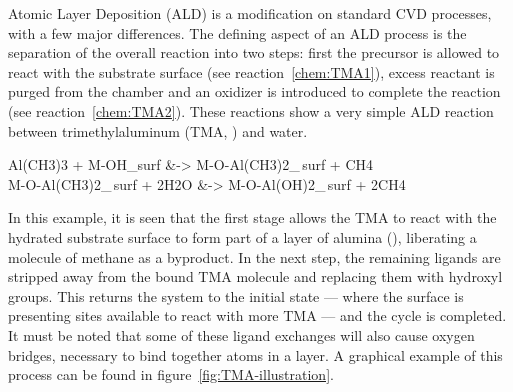 Atomic Layer Deposition (ALD) is a modification on standard CVD processes, with a few major differences. The defining aspect of an ALD process is the separation of the overall reaction into two steps: first the precursor is allowed to react with the substrate surface (see reaction~\ref{chem:TMA1}), excess reactant is purged from the chamber and an oxidizer is introduced to complete the reaction (see reaction~\ref{chem:TMA2}). These reactions show a very simple ALD reaction between trimethylaluminum (TMA, ) and water. 

\begin{reactions}
	Al(CH3)3 + M-OH_{surf} &-> M-O-Al(CH3)2_{\,surf} + CH4 \label{chem:TMA1}%
		\\
	M-O-Al(CH3)2_{\,surf} + 2H2O &-> M-O-Al(OH)2_{\,surf} + 2CH4 \label{chem:TMA2}%
\end{reactions}


In this example, it is seen that the first stage allows the TMA to react with the hydrated substrate surface to form part of a layer of alumina (), liberating a molecule of methane as a byproduct. In the next step, the remaining ligands are stripped away from the bound TMA molecule and replacing them with hydroxyl groups. This returns the system to the initial state --- where the surface is presenting sites available to react with more TMA --- and the cycle is completed. It must be noted that some of these ligand exchanges will also cause oxygen bridges, necessary to bind together atoms in a layer. A graphical example of this process can be found in figure~\ref{fig:TMA-illustration}.


